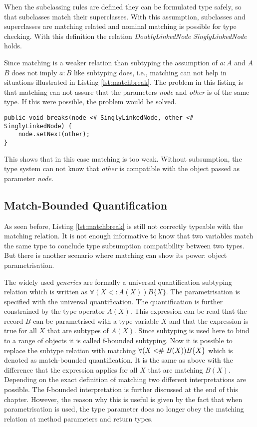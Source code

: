 When the subclassing rules are defined they can be formulated type
safely, so that subclasses match their superclasses. With this
assumption, subclasses and superclasses are matching related and
nominal matching is possible for type checking. With this definition
the relation \emph{DoublyLinkedNode} \match \emph{SinglyLinkedNode} holds.

Since matching is a weaker relation than subtyping the assumption of
$a:A$ and $A$ \match $B$ does not imply $a:B$ like subtyping does,
i.e., matching can not help in situations illustrated in Listing
\ref{lst:matchbreak}. The problem in this listing is that matching can
not assure that the parameters \emph{node} and \emph{other} is of the
same type. If this were possible, the problem would be solved.

\begin{lstlisting}[float=ht,label={lst:matchbreak},caption={Matching relation in the break method.}]
public void breaks(node <# SinglyLinkedNode, other <# SinglyLinkedNode) {
	node.setNext(other);
}
\end{lstlisting}

This shows that in this case matching is too weak. Without subsumption,
the type system can not know that \emph{other} is compatible with the
object passed as parameter \emph{node}.

\subsection{Match-Bounded Quantification}
As seen before, Listing \ref{lst:matchbreak} is still not correctly
typeable with the matching relation. It is not enough informative to
know that two variables match the same type to conclude type
subsumption compatibility between two types. But there is another
scenario where matching can show its power: object parametrisation.

The widely used \emph{generics} are formally a universal quantification
subtyping relation which is written as $\forall (X <: A(X))B\{X\}$. The
parametrisation is specified with the universal quantification. The
quantification is further constrained by the type operator $A(X)$. This
expression can be read that the record $B$ can be parametrised with a
type variable $X$ and that the expression is true for all $X$ that are
subtypes of $A(X)$.  Since subtyping is used here to bind \X to a range of
objects it is called f-bounded subtyping. Now it is possible to replace
the subtype relation with matching $\forall(X <\!\!\#~ B(X))B\{X\}$
which is denoted as match-bounded quantification. It is the same as
above with the difference that the expression applies for all $X$ that
are matching $B(X)$. Depending on the exact definition of matching two
different interpretations are possible\cite{abadi_subtyping_1996}. The
f-bounded interpretation is further discussed at the end of this
chapter. However, the reason why this is useful is given by the fact
that when parametrisation is used, the type parameter does no longer
obey the matching relation at method parameters and return types.

